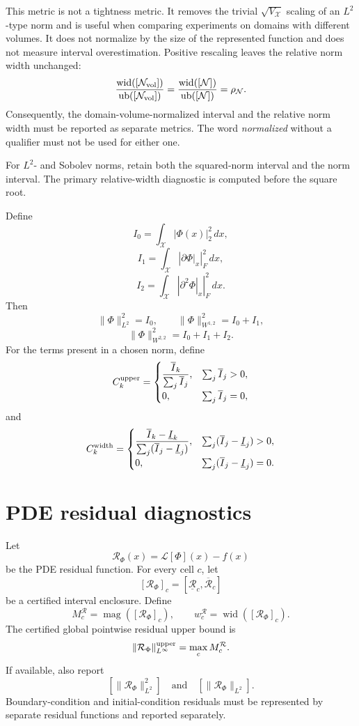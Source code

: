 \documentclass[11pt]{article}
\newcommand{\ub}{\operatorname{ub}}
\newcommand{\wid}{\operatorname{wid}}
\newcommand{\magI}{\operatorname{mag}}
\begin{document}
This metric is not a tightness metric.  It removes the trivial
\(\sqrt{V_{\mathcal X}}\) scaling of an \(L^2\)-type norm and is useful
when comparing experiments on domains with different volumes.  It does not
normalize by the size of the represented function and does not measure
interval overestimation.  Positive rescaling leaves the relative norm width
unchanged:
\[
 \frac{\wid([\mathcal N_{\rm vol}])}
 {\ub([\mathcal N_{\rm vol}])}
 =
 \frac{\wid([\mathcal N])}{\ub([\mathcal N])}
 =\rho_{\mathcal N}.
\]
Consequently, the domain-volume-normalized interval and the relative norm
width must be reported as separate metrics.  The word \emph{normalized}
without a qualifier must not be used for either one.

For \(L^2\)- and Sobolev norms, retain both the squared-norm interval and the
norm interval.  The primary relative-width diagnostic is computed before the
square root.

Define
\[
 I_0=\int_{\mathcal X}|\Phi(x)|_2^2\,dx,
\]
\[
 I_1=\int_{\mathcal X}\left|\left.\partial\Phi\right|_x\right|_F^2\,dx,
\]
\[
 I_2=\int_{\mathcal X}\left|\left.\partial^2\Phi\right|_x\right|_F^2\,dx.
\]
Then
\[
 \|\Phi\|_{L^2}^2=I_0,\qquad
 \|\Phi\|_{W^{1,2}}^2=I_0+I_1,
\]
\[
 \|\Phi\|_{W^{2,2}}^2=I_0+I_1+I_2.
\]
For the terms present in a chosen norm, define
\[
 C_k^{\rm upper}
 =\begin{cases}
 \dfrac{\overline I_k}{\sum_j\overline I_j},
 &\sum_j\overline I_j>0,\\
 0,&\sum_j\overline I_j=0,
 \end{cases}
\]
and
\[
 C_k^{\rm width}
 =\begin{cases}
 \dfrac{\overline I_k-\underline I_k}
 {\sum_j(\overline I_j-\underline I_j)},
 &\sum_j(\overline I_j-\underline I_j)>0,\\
 0,&\sum_j(\overline I_j-\underline I_j)=0.
 \end{cases}
\]

\section{PDE residual diagnostics}

Let
\[
 \mathcal R_\Phi(x)=\mathcal L[\Phi](x)-f(x)
\]
be the PDE residual function.  For every cell \(c\), let
\[
 [\mathcal R_\Phi]_c
 =[\underline{\mathcal R}_c,\overline{\mathcal R}_c]
\]
be a certified interval enclosure.  Define
\[
 M_c^{\mathcal R}=\magI([\mathcal R_\Phi]_c),\qquad
 w_c^{\mathcal R}=\wid([\mathcal R_\Phi]_c).
\]
The certified global pointwise residual upper bound is
\[
 \|\mathcal R_\Phi\|_{L^\infty}^{\rm upper}
 =\max_c M_c^{\mathcal R}.
\]
If available, also report
\[
 [\|\mathcal R_\Phi\|_{L^2}^2]
 \quad\text{and}\quad
 [\|\mathcal R_\Phi\|_{L^2}].
\]
Boundary-condition and initial-condition residuals must be represented by
separate residual functions and reported separately.
\end{document}
